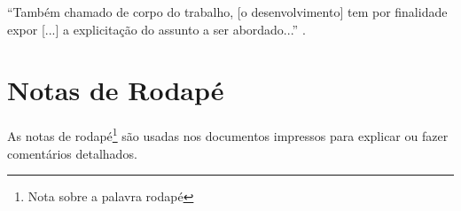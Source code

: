 ``Também chamado de corpo do trabalho, [o desenvolvimento] tem por finalidade expor [...] a explicitação do assunto a ser abordado...'' \cite{artigo}.

\section{Notas de Rodapé}
As notas de rodapé\footnote{Nota sobre a palavra rodapé} são usadas nos documentos impressos para explicar ou fazer comentários detalhados.
